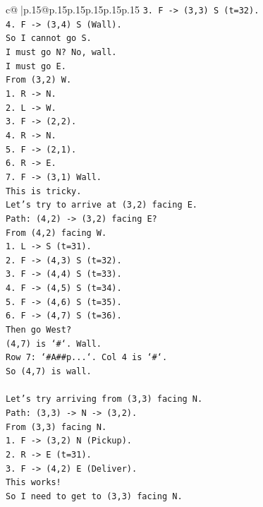 \documentclass{article}
\begin{document}
{\begin{supertabular}{c@{$\;$}|p{.15\linewidth}@{}p{.15\linewidth}p{.15\linewidth}p{.15\linewidth}p{.15\linewidth}p{.15\linewidth}}
{{{\texttt{3. F {-}> (3,3) S (t=32).} \\
\texttt{4. F {-}> (3,4) S (Wall).} \\
\texttt{So I cannot go S.} \\
\texttt{I must go N? No, wall.} \\
\texttt{I must go E.} \\
\texttt{From (3,2) W.} \\
\texttt{1. R {-}> N.} \\
\texttt{2. L {-}> W.} \\
\texttt{3. F {-}> (2,2).} \\
\texttt{4. R {-}> N.} \\
\texttt{5. F {-}> (2,1).} \\
\texttt{6. R {-}> E.} \\
\texttt{7. F {-}> (3,1) Wall.} \\
\texttt{This is tricky.} \\
\texttt{Let's try to arrive at (3,2) facing E.} \\
\texttt{Path: (4,2) {-}> (3,2) facing E?} \\
\texttt{From (4,2) facing W.} \\
\texttt{1. L {-}> S (t=31).} \\
\texttt{2. F {-}> (4,3) S (t=32).} \\
\texttt{3. F {-}> (4,4) S (t=33).} \\
\texttt{4. F {-}> (4,5) S (t=34).} \\
\texttt{5. F {-}> (4,6) S (t=35).} \\
\texttt{6. F {-}> (4,7) S (t=36).} \\
\texttt{Then go West?} \\
\texttt{(4,7) is `\#`. Wall.} \\
\texttt{Row 7: `\#A\#\#p...`. Col 4 is `\#`.} \\
\texttt{So (4,7) is wall.} \\
\\ 
\texttt{Let's try arriving from (3,3) facing N.} \\
\texttt{Path: (3,3) {-}> N {-}> (3,2).} \\
\texttt{From (3,3) facing N.} \\
\texttt{1. F {-}> (3,2) N (Pickup).} \\
\texttt{2. R {-}> E (t=31).} \\
\texttt{3. F {-}> (4,2) E (Deliver).} \\
\texttt{This works!} \\
\texttt{So I need to get to (3,3) facing N.} \\
}}}
\end{supertabular}}
\end{document}
